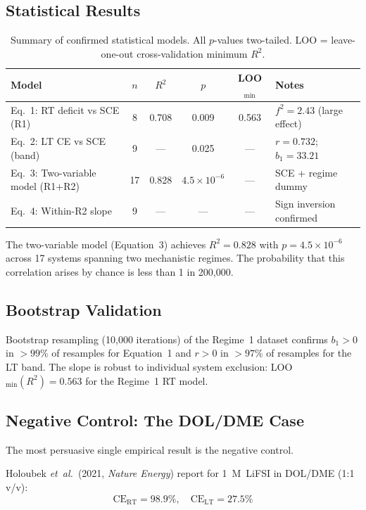 \documentclass[11pt]{article}
\theoremstyle{plain}
\theoremstyle{definition}
\theoremstyle{remark}
\begin{document}
\subsection{Statistical Results}

\begin{table}[h!]
\centering
\caption{Summary of confirmed statistical models. All $p$-values two-tailed.
LOO = leave-one-out cross-validation minimum $R^2$.}
\label{tab:stats}
\begin{tabular}{lccccl}
\toprule
Model & $n$ & $R^2$ & $p$ & LOO$_{\min}$ & Notes \\
\midrule
Eq.~1: RT deficit vs SCE (R1) & 8 & 0.708 & 0.009 & 0.563
  & $f^2 = 2.43$ (large effect) \\
Eq.~2: LT CE vs SCE (band) & 9 & --- & 0.025 & ---
  & $r = 0.732$; $b_1 = 33.21$ \\
Eq.~3: Two-variable model (R1+R2) & 17 & 0.828 & $4.5\times10^{-6}$ & ---
  & SCE + regime dummy \\
Eq.~4: Within-R2 slope & 9 & --- & --- & ---
  & Sign inversion confirmed \\
\bottomrule
\end{tabular}
\end{table}

\noindent The two-variable model (Equation~3) achieves $R^2 = 0.828$ with
$p = 4.5\times10^{-6}$ across 17 systems spanning two mechanistic regimes.
The probability that this correlation arises by chance is less than 1 in
200{,}000.

\subsection{Bootstrap Validation}

Bootstrap resampling (10{,}000 iterations) of the Regime~1 dataset confirms
$b_1 > 0$ in $>99\%$ of resamples for Equation~1 and $r > 0$ in $>97\%$ of
resamples for the LT band.  The slope is robust to individual system exclusion:
LOO$_{\min}(R^2) = 0.563$ for the Regime~1 RT model.

\subsection{Negative Control: The DOL/DME Case}

The most persuasive single empirical result is the negative control.

Holoubek \textit{et~al.}\ (2021, \textit{Nature Energy}) report for
1~M~LiFSI in DOL/DME (1:1 v/v):
\begin{equation}
  \mathrm{CE}_{\mathrm{RT}} = 98.9\%, \quad \mathrm{CE}_{\mathrm{LT}} = 27.5\%
  \label{eq:DOL_DME}
\end{equation}
\end{document}
